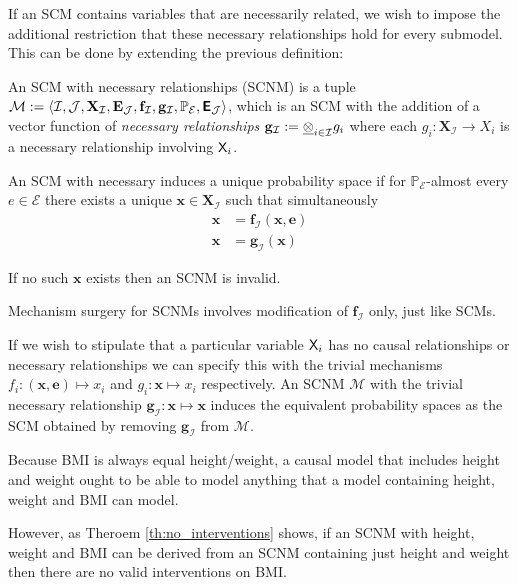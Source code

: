 If an SCM contains variables that are necessarily related, we wish to impose the additional restriction that these necessary relationships hold for every submodel. This can be done by extending the previous definition:

\begin{definition}
An SCM with necessary relationships (SCNM) is a tuple $\mathcal{M}:=\langle \mathcal{I},\mathcal{J},\mathbf{X}_{\mathcal{I}},\mathbf{E}_{\mathcal{J}},\mathbf{f}_{\mathcal{I}},\mathbf{g}_{\mathcal{I}},\mathbb{P}_{\mathcal{E}},\bm{\mathsf{E}}_{\mathcal{J}}\rangle$, which is an SCM with the addition of a vector function of \emph{necessary relationships} $\mathbf{g}_{\mathcal{I}}:=\underline{\otimes}_{i\in\mathcal{I}} g_i$ where each $g_i:\mathbf{X}_{\mathcal{I}}\to X_i$ is a necessary relationship involving $\mathsf{X}_i$.

An SCM with necessary induces a unique probability space if for $\mathbb{P}_{\mathcal{E}}$-almost every $e\in\mathcal{E}$ there exists a unique $\mathbf{x}\in\mathbf{X}_{\mathcal{I}}$ such that simultaneously
\begin{align}
	\mathbf{x} &= \mathbf{f}_{\mathcal{I}}(\mathbf{x},\mathbf{e})\\
	\mathbf{x} &= \mathbf{g}_{\mathcal{I}}(\mathbf{x})
\end{align}

If no such $\mathbf{x}$ exists then an SCNM is invalid.

Mechanism surgery for SCNMs involves modification of $\mathbf{f}_{\mathcal{I}}$ only, just like SCMs.

If we wish to stipulate that a particular variable $\mathsf{X}_i$ has no causal relationships or necessary relationships we can specify this with the trivial mechanisms $f_i:(\mathbf{x},\mathbf{e})\mapsto x_i$ and $g_i:\mathbf{x} \mapsto x_i$ respectively. An SCNM $\mathcal{M}$ with the trivial necessary relationship $\mathbf{g}_{\mathcal{I}}: \mathbf{x}\mapsto \mathbf{x}$ induces the equivalent probability spaces as the SCM obtained by removing $\mathbf{g}_{\mathcal{I}}$ from $\mathcal{M}$.
\end{definition}

Because BMI is always equal height/weight, a causal model that includes height and weight ought to be able to model anything that a model containing height, weight and BMI can model. 

However, as Theroem \ref{th:no_interventions} shows, if an SCNM with height, weight and BMI can be derived from an SCNM containing just height and weight then there are no valid interventions on BMI.

